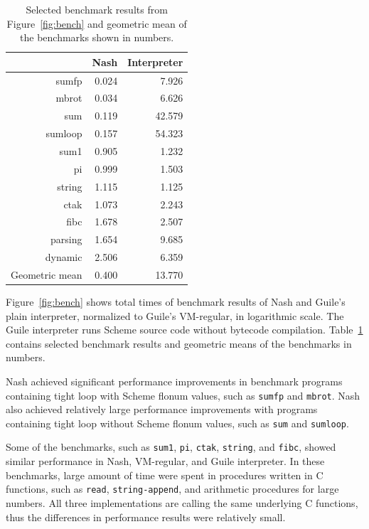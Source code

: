 \documentclass[preprint, 10pt]{sigplanconf}
\begin{document}
\begin{table}
  \centering
  \begin{tabular}{rrr}
     & Nash & Interpreter \\
    \toprule
    sumfp & 0.024 & 7.926 \\
    mbrot & 0.034 & 6.626 \\
    sum & 0.119 & 42.579 \\
    sumloop & 0.157 & 54.323 \\
    \midrule
    sum1 & 0.905 & 1.232 \\
    pi & 0.999 & 1.503 \\
    string & 1.115 & 1.125 \\
    \midrule
    ctak & 1.073 & 2.243 \\
    fibc & 1.678 & 2.507 \\
    parsing & 1.654 & 9.685 \\
    dynamic & 2.506 & 6.359 \\
    \midrule
    Geometric mean & 0.400 & 13.770 \\
  \end{tabular}
  \caption{Selected benchmark results from
    Figure~\hyperref[fig:bench]{\ref{fig:bench}} and geometric mean of the
    benchmarks shown in numbers.}
\label{tab:compguile}
\end{table}

Figure~\ref{fig:bench} shows total times of benchmark results of Nash and
Guile's plain interpreter, normalized to Guile's VM-regular, in logarithmic
scale.  The Guile interpreter runs Scheme source code without bytecode
compilation.  Table~\hyperref[tab:compguile]{\ref{tab:compguile}} contains
selected benchmark results and geometric means of the benchmarks in numbers.

Nash achieved significant performance improvements in benchmark programs
containing tight loop with Scheme flonum values, such as \texttt{sumfp} and
\texttt{mbrot}.  Nash also achieved relatively large performance improvements
with programs containing tight loop without Scheme flonum values, such as
\texttt{sum} and \texttt{sumloop}.

Some of the benchmarks, such as \texttt{sum1}, \texttt{pi}, \texttt{ctak},
\texttt{string}, and \texttt{fibc}, showed similar performance in Nash,
VM-regular, and Guile interpreter. In these benchmarks, large amount of time
were spent in procedures written in C functions, such as \texttt{read},
\texttt{string-append}, and arithmetic procedures for large numbers.  All three
implementations are calling the same underlying C functions, thus the
differences in performance results were relatively small.
\end{document}
